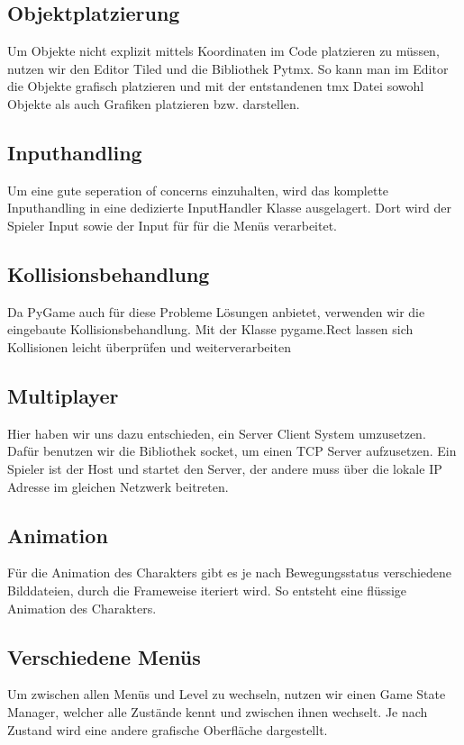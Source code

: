 \documentclass[12pt, a4paper, twoside]{article}
\begin{document}
\subsection{Objektplatzierung}
Um Objekte nicht explizit mittels Koordinaten im Code platzieren zu müssen,
nutzen wir den Editor Tiled und die Bibliothek Pytmx. So kann man im Editor
die Objekte grafisch platzieren und mit der entstandenen tmx Datei sowohl Objekte als auch 
Grafiken platzieren bzw. darstellen.

\subsection{Inputhandling}
Um eine gute seperation of concerns einzuhalten, wird das komplette Inputhandling in eine
dedizierte InputHandler Klasse ausgelagert. Dort wird der Spieler Input sowie der Input für
für die Menüs verarbeitet.

\subsection{Kollisionsbehandlung}
Da PyGame auch für diese Probleme Lösungen anbietet, verwenden wir die eingebaute Kollisionsbehandlung.
Mit der Klasse pygame.Rect lassen sich Kollisionen leicht überprüfen und weiterverarbeiten

\subsection{Multiplayer}
Hier haben wir uns dazu entschieden, ein Server Client System umzusetzen. 
Dafür benutzen wir die Bibliothek socket, um einen TCP Server aufzusetzen. 
Ein Spieler ist der Host und startet den Server, der andere muss über die lokale IP Adresse 
im gleichen Netzwerk beitreten. 

\subsection{Animation}
Für die Animation des Charakters gibt es je nach Bewegungsstatus verschiedene Bilddateien, 
durch die Frameweise iteriert wird. So entsteht eine flüssige Animation des Charakters.

\subsection{Verschiedene Menüs}
Um zwischen allen Menüs und Level zu wechseln, nutzen wir einen Game State Manager, welcher
alle Zustände kennt und zwischen ihnen wechselt. Je nach Zustand wird eine andere grafische Oberfläche 
dargestellt.
\end{document}

